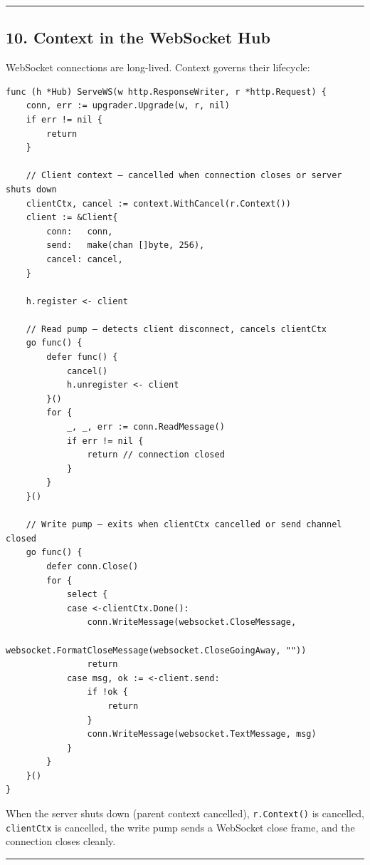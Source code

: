 \documentclass[11pt,a4paper,oneside]{book}
\begin{document}
\begin{center}\rule{0.5\linewidth}{0.5pt}\end{center}

\subsection{10. Context in the WebSocket
Hub}

WebSocket connections are long-lived. Context governs their lifecycle:

\begin{verbatim}
func (h *Hub) ServeWS(w http.ResponseWriter, r *http.Request) {
    conn, err := upgrader.Upgrade(w, r, nil)
    if err != nil {
        return
    }

    // Client context — cancelled when connection closes or server shuts down
    clientCtx, cancel := context.WithCancel(r.Context())
    client := &Client{
        conn:   conn,
        send:   make(chan []byte, 256),
        cancel: cancel,
    }

    h.register <- client

    // Read pump — detects client disconnect, cancels clientCtx
    go func() {
        defer func() {
            cancel()
            h.unregister <- client
        }()
        for {
            _, _, err := conn.ReadMessage()
            if err != nil {
                return // connection closed
            }
        }
    }()

    // Write pump — exits when clientCtx cancelled or send channel closed
    go func() {
        defer conn.Close()
        for {
            select {
            case <-clientCtx.Done():
                conn.WriteMessage(websocket.CloseMessage,
                    websocket.FormatCloseMessage(websocket.CloseGoingAway, ""))
                return
            case msg, ok := <-client.send:
                if !ok {
                    return
                }
                conn.WriteMessage(websocket.TextMessage, msg)
            }
        }
    }()
}
\end{verbatim}

When the server shuts down (parent context cancelled),
\texttt{r.Context()} is cancelled, \texttt{clientCtx} is cancelled, the
write pump sends a WebSocket close frame, and the connection closes
cleanly.

\begin{center}\rule{0.5\linewidth}{0.5pt}\end{center}
\end{document}

